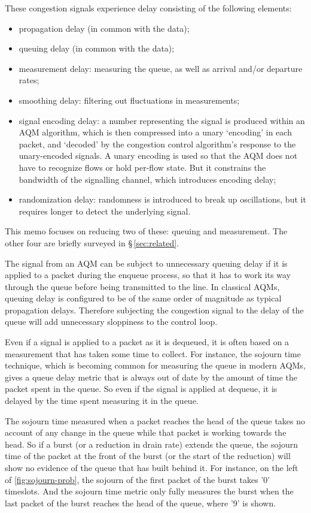 These congestion signals experience delay consisting of the following elements:
\begin{itemize}[nosep]
	\item propagation delay (in common with the data);
	\item queuing delay (in common with the data);
	\item measurement delay: measuring the queue, as well as arrival and/or departure rates;
	\item smoothing delay: filtering out fluctuations in measurements;
	\item signal encoding delay: a number representing the signal is produced within an AQM algorithm, which is then compressed into a unary `encoding' in each packet, and `decoded' by the congestion control algorithm's response to the unary-encoded signals. A unary encoding is used so that the AQM does not have to recognize flows or hold per-flow state. But it constrains the bandwidth of the signalling channel, which introduces encoding delay;
	\item randomization delay: randomness is introduced to break up oscillations, but it requires longer to detect the underlying signal.
\end{itemize}

This memo focuses on reducing two of these: queuing and measurement. The other four are briefly surveyed in \S\,\ref{sec:related}.

The signal from an AQM can be subject to unnecessary queuing delay if it is applied to a packet during the enqueue process, so that it has to work its way through the queue before being transmitted to the line. In classical AQMs, queuing delay is configured to be of the same order of magnitude as typical propagation delays. Therefore subjecting the congestion signal to the delay of the queue will add unnecessary sloppiness to the control loop.

Even if a signal is applied to a packet as it is dequeued, it is often based on a measurement that has taken some time to collect. For instance, the sojourn time technique, which is becoming common for measuring the queue in modern AQMs, gives a queue delay metric that is always out of date by the amount of time the packet spent in the queue. So even if the signal is applied at dequeue, it is delayed by the time spent measuring it in the queue.

The sojourn time measured when a packet reaches the head of the queue takes no account of any change in the queue while that packet is working towards the head. So if a burst (or a reduction in drain rate) extends the queue, the sojourn time of the packet at the front of the burst (or the start of the reduction) will show no evidence of the queue that has built behind it. For instance, on the left of \autoref{fig:sojourn-prob}, the sojourn of the first packet of the burst takes '0' timeslots. And the sojourn time metric only fully measures the burst when the last packet of the burst reaches the head of the queue, where '9' is shown. 

